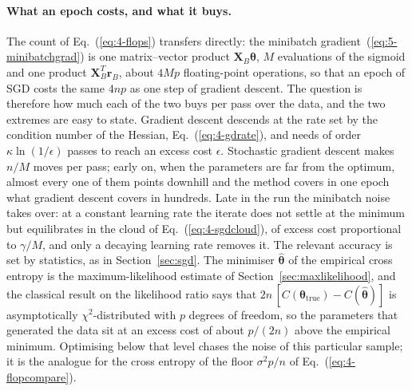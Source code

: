 \paragraph{What an epoch costs, and what it buys.}
The count of Eq.~(\ref{eq:4-flops}) transfers directly: the minibatch
gradient~(\ref{eq:5-minibatchgrad}) is one matrix--vector product
$\bm{X}_B\bm{\theta}$, $M$ evaluations of the sigmoid and one product
$\bm{X}_B^{T}\bm{r}_B$, about $4Mp$ floating-point operations, so that an
epoch of SGD costs the same $4np$ as one step of gradient descent.  The
question is therefore how much each of the two buys per pass over the
data, and the two extremes are easy to state.  Gradient descent
descends at the rate set by the condition number of the Hessian,
Eq.~(\ref{eq:4-gdrate}), and needs of order $\kappa\ln(1/\epsilon)$ passes
to reach an excess cost $\epsilon$.  Stochastic gradient descent makes
$n/M$ moves per pass; early on, when the parameters are far from the
optimum, almost every one of them points downhill and the method covers in
one epoch what gradient descent covers in hundreds.  Late in the run the
minibatch noise takes over: at a constant learning rate the iterate does
not settle at the minimum but equilibrates in the cloud of
Eq.~(\ref{eq:4-sgdcloud}), of excess cost proportional to $\gamma/M$, and
only a decaying learning rate removes it.  The relevant accuracy is set by
statistics, as in Section~\ref{sec:sgd}.  The minimiser $\hat{\bm{\theta}}$
of the empirical cross entropy is the maximum-likelihood estimate of
Section~\ref{sec:maxlikelihood}, and the classical result on the likelihood
ratio says that $2n\,[C(\bm{\theta}_{\mathrm{true}})-C(\hat{\bm{\theta}})]$
is asymptotically $\chi^{2}$-distributed with $p$ degrees of freedom, so
the parameters that generated the data sit at an excess cost of about
$p/(2n)$ above the empirical minimum.  Optimising below that level chases
the noise of this particular sample; it is the analogue for the cross
entropy of the floor $\sigma^{2}p/n$ of Eq.~(\ref{eq:4-flopcompare}).

